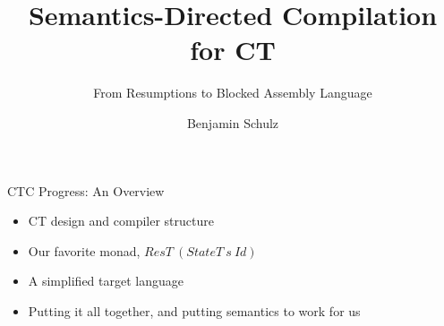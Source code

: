 \documentclass{beamer}
\title{Semantics-Directed Compilation for CT}
\subtitle{From Resumptions to Blocked Assembly Language}
\author{Benjamin Schulz}
\begin{document}
\maketitle{}

\begin{frame}{CTC Progress: An Overview}


\begin{itemize}

\item{CT design and compiler structure}

\item{Our favorite monad, $ResT\ (StateT\ s\ Id)$}

\item{A simplified target language}

\item{Putting it all together, and putting semantics to work for us}

\end{itemize}

\end{frame}
\end{document}
